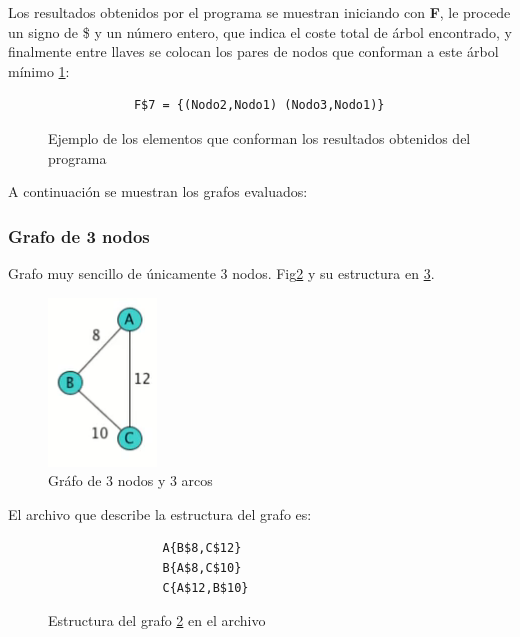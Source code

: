     Los resultados obtenidos por el programa se muestran iniciando con \textbf{F}, le procede un signo de \$ y un número entero, que indica el coste total de árbol encontrado, y finalmente entre llaves se colocan los pares de nodos que conforman a este árbol mínimo \ref{ResultadoEjemplo}:
    
    \begin{figure}[h!]
        \centering
        \begin{verbatim}
            F$7 = {(Nodo2,Nodo1) (Nodo3,Nodo1)}\end{verbatim}
        \caption{Ejemplo de los elementos que conforman los resultados obtenidos del programa}
        \label{ResultadoEjemplo}
    \end{figure}
    
    A continuación se muestran los grafos evaluados:
    
    \subsubsection*{Grafo de 3 nodos}
        Grafo muy sencillo de únicamente 3 nodos. Fig\ref{Grafo3} y su estructura en \ref{ArchivoGrafo3}.
        
        \begin{figure}[h!]
            \centering
            \includegraphics{Kruskal/Grafo3.png}
            \caption{Gráfo de 3 nodos y 3 arcos}
            \label{Grafo3}
        \end{figure}
            
        El archivo que describe la estructura del grafo es:
        \begin{figure}[h!]
            \centering
            \begin{verbatim}
                A{B$8,C$12}
                B{A$8,C$10}
                C{A$12,B$10}
            \end{verbatim}
            \caption{Estructura del grafo \ref{Grafo3} en el archivo}
            \label{ArchivoGrafo3}
        \end{figure} 
        

